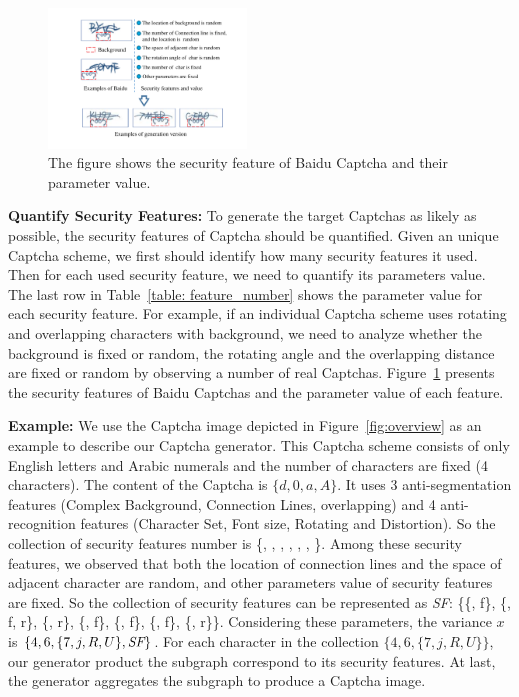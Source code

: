 \begin{figure}
  \centering
  \includegraphics[width=0.47\textwidth]{fig/captcha_analysis/captcha_analysis.pdf}
  \caption{The figure shows the security feature of Baidu Captcha and their parameter value.}
  \label{fig: captcha_analysis}
\end{figure}

\noindent \textbf{Quantify Security Features:} To generate the target Captchas as likely as possible, the security features of Captcha should be quantified. Given an unique Captcha scheme, we first should identify how many security features it used. Then for each used security feature, we need to quantify its parameters value. The last row in Table~\ref{table: feature_number} shows the parameter value for each security feature. For example, if an individual Captcha scheme uses rotating and overlapping characters with background, we need to analyze whether the background is fixed or random, the rotating angle and the overlapping distance are fixed or random by observing a number of real Captchas. Figure~\ref{fig: captcha_analysis} presents the security features of Baidu Captchas and the parameter value of each feature.

\noindent \textbf{Example:} We use the Captcha image depicted in Figure~\ref{fig:overview} as an example to describe our Captcha generator. This Captcha scheme consists of only English letters and Arabic numerals and the number of characters are fixed (4 characters). The content of the Captcha is $\{d, 0, a, A\}$.
It uses 3 anti-segmentation features (Complex Background, Connection Lines, overlapping) and 4 anti-recognition features (Character Set, Font size, Rotating and Distortion). So the collection of security features number is \{, , , , , , \}.
Among these security features, we observed that both the location of connection lines and the space of adjacent character are random, and other parameters value of security features are fixed. So the collection of security features can be represented as \emph{SF}: \{\{, f\}, \{, f, r\}, \{, r\}, \{, f\}, \{, f\}, \{, f\}, \{, r\}\}.
Considering these parameters, the variance $x$ is $\{4, 6, \{7, j, R, U\}, \emph{SF}\}$.
For each character in the collection $\{4, 6, \{7, j, R, U\}\}$, our generator product the subgraph correspond to its security features. At last, the generator aggregates the subgraph to produce a Captcha image.

